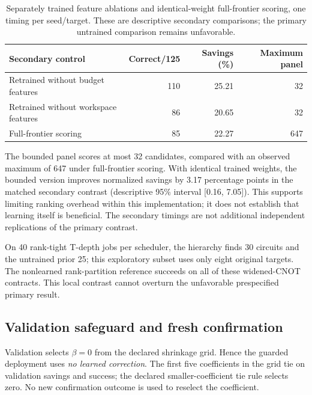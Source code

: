 \begin{table}[htbp]\centering\small

\begin{tabular}{@{}lrrr@{}}\toprule

Secondary control & Correct/125 & Savings (\%) & Maximum panel \\\midrule

Retrained without budget features & 110 & 25.21 & 32 \\

Retrained without workspace features & 86 & 20.65 & 32 \\

Full-frontier scoring & 85 & 22.27 & 647 \\

\bottomrule\end{tabular}

\caption{Separately trained feature ablations and identical-weight full-frontier scoring, one timing per seed/target. These are descriptive secondary comparisons; the primary untrained comparison remains unfavorable.}\label{tab:ablation}\end{table}

The bounded panel scores at most 32 candidates, compared with an observed maximum of 647 under full-frontier scoring. With identical trained weights, the bounded version improves normalized savings by 3.17 percentage points in the matched secondary contrast (descriptive 95\% interval [0.16, 7.05]). This supports limiting ranking overhead within this implementation; it does not establish that learning itself is beneficial. The secondary timings are not additional independent replications of the primary contrast.

On 40 rank-tight T-depth jobs per scheduler, the hierarchy finds 30 circuits and the untrained prior 25; this exploratory subset uses only eight original targets. The nonlearned rank-partition reference succeeds on all of these widened-CNOT contracts. This local contrast cannot overturn the unfavorable prespecified primary result.

\subsection{Validation safeguard and fresh confirmation}

Validation selects $\beta=0$ from the declared shrinkage grid. Hence the guarded deployment uses \emph{no learned correction}. The first five coefficients in the grid tie on validation savings and success; the declared smaller-coefficient tie rule selects zero. No new confirmation outcome is used to reselect the coefficient.

